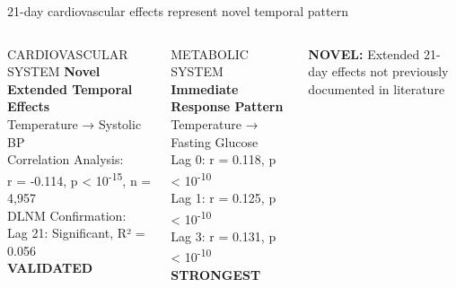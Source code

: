 \documentclass[10pt,aspectratio=169]{beamer}
\begin{document}
\begin{frame}{21-day cardiovascular effects represent novel temporal pattern}
\begin{columns}[T]
\begin{block}{CARDIOVASCULAR SYSTEM}
\textbf{Novel Extended Temporal Effects} \\
Temperature → Systolic BP \\
\vspace{0.2cm}
Correlation Analysis: \\
r = -0.114, p < 10\textsuperscript{-15}, n = 4,957 \\
\vspace{0.2cm}
DLNM Confirmation: \\
Lag 21: Significant, R² = 0.056 \\
\textcolor{accentorange}{\textbf{VALIDATED}}
\end{block}

\vspace{0.2cm}

\begin{block}{METABOLIC SYSTEM}
\textbf{Immediate Response Pattern} \\
Temperature → Fasting Glucose \\
\vspace{0.2cm}
Lag 0: r = 0.118, p < 10\textsuperscript{-10} \\
Lag 1: r = 0.125, p < 10\textsuperscript{-10} \\
Lag 3: r = 0.131, p < 10\textsuperscript{-10} \\
\textcolor{accentorange}{\textbf{STRONGEST}}
\end{block}

\vspace{0.2cm}

\vspace{0.3cm}
\textcolor{accentorange}{\textbf{NOVEL:}} Extended 21-day effects not previously documented in literature
\end{columns}
\end{frame}
\end{document}
